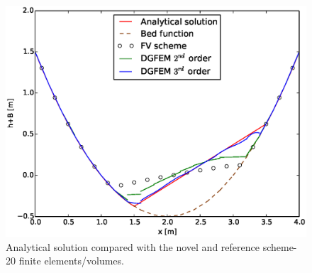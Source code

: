 \begin{figure}[!ht]
\begin{minipage}[t]{0.44\textwidth}
\begin{center}
								    \includegraphics[width=1.0\textwidth]{OBR/20.eps}
								    \caption{Analytical solution compared with the novel and reference scheme-20 finite elements/volumes.}\label{20}
								    \end{center}
								\end{minipage}
				\end{figure}
